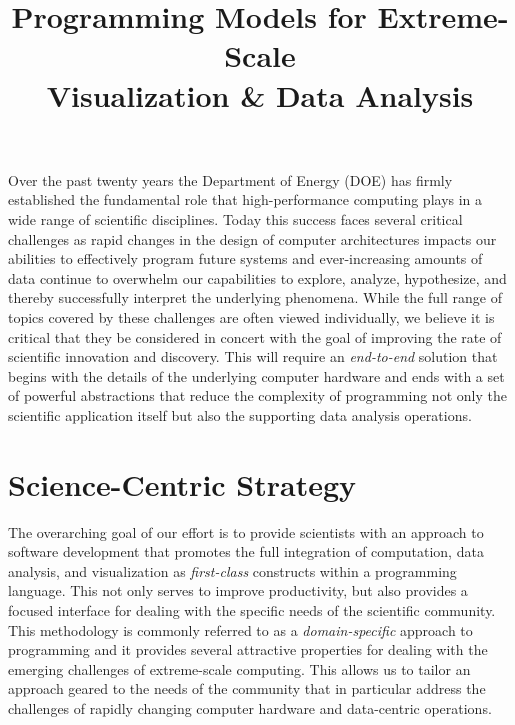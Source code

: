 \documentclass{tcvg}
\title{Programming Models for Extreme-Scale\\ 
         Visualization \& Data Analysis}
\newcommand{\backgroundpic}[1] {
	\ClearShipoutPicture
	\AddToShipoutPicture{
		\put(0,0) {
			\parbox[b][\paperheight]{\paperwidth}{
				\vfill
				\centering
				\texttt{[image: \#1]}
				\vfill
			}
		}
	}
}
\begin{document}
	
  \backgroundpic{figures/bg-front.pdf}

  \maketitle 


   Over the past twenty years the Department of Energy (DOE) has firmly 
   established the fundamental role that high-performance computing 
   plays in a wide range of scientific disciplines.  Today this success
   faces several critical challenges as rapid changes in the design of 
   computer architectures impacts our abilities to effectively program  
   future systems and ever-increasing amounts of data continue to 
   overwhelm our capabilities to explore, analyze, hypothesize, and 
   thereby successfully interpret the underlying phenomena. While the 
   full range of topics covered by these challenges are often viewed 
   individually, we believe it is critical that they be considered in 
   concert with the goal of improving the rate of scientific innovation
   and discovery.  This will require an \emph{end-to-end} solution that 
   begins with the details of the underlying computer hardware and ends 
   with a set of powerful abstractions that reduce the complexity of 
   programming not only the scientific application itself but also the 
   supporting data analysis operations. 

  \section*{Science-Centric Strategy}

   The overarching goal of our effort is to provide scientists with an 
   approach to software development that promotes the full integration of 
   computation, data analysis, and visualization as \emph{first-class} 
   constructs within a programming language.  This not only serves to 
   improve productivity, but also provides a focused interface for 
   dealing with the specific needs of the scientific community.  This 
   methodology is commonly referred to as a \emph{domain-specific} 
   approach to programming and it provides several attractive properties
   for dealing with the emerging challenges of extreme-scale computing.
   This allows us to tailor an approach geared to the needs of the 
   community that in particular address the challenges of rapidly changing
   computer hardware and data-centric operations. 
\end{document}
